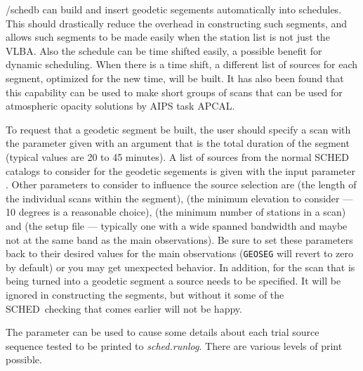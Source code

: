 \documentclass{report}
\newcommand{\schedb}{{\sc SCHED~}}
\begin{document}
/schedb can build and insert geodetic segements automatically into
schedules.  This should drastically reduce the overhead in
constructing such segments, and allows such segments to be made easily
when the station list is not just the VLBA.  Also the schedule can be
time shifted easily, a possible benefit for dynamic scheduling.  When
there is a time shift, a different list of sources for each segment,
optimized for the new time, will be built.  It has also been found that
this capability can be used to make short groups of scans that can
be used for atmospheric opacity solutions by AIPS task APCAL.

To request that a geodetic segment be built, the user should specify a
scan with the parameter  given with
an argument that is the total duration of the segment (typical values
are 20 to 45 minutes).  A list of sources from the normal \schedb
catalogs to consider for the geodetic segements is given with the
input parameter .  Other parameters
to consider to influence the source selection are  (the length of the individual scans within the
segment),  (the minimum elevation
to consider --- 10 degrees is a reasonable choice),  (the minimum number of stations in a scan) and
 (the setup file --- typically one with
a wide spanned bandwidth and maybe not at the same band as the main
observations).  Be sure to set these parameters back to their desired
values for the main observations ({\tt GEOSEG} will revert to zero by
default) or you may get unexpected behavior.  In addition, for the
scan that is being turned into a geodetic segment a source needs to be
specified.  It will be ignored in constructing the segments, but
without it some of the \schedb checking that comes earlier will not be
happy.

The parameter  can be used to cause
some details about each trial source sequence tested to be printed to
{\sl sched.runlog}.  There are various levels of print possible.
\end{document}
